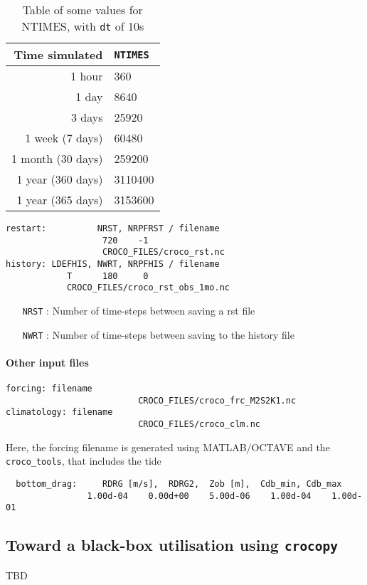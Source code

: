 \documentclass{article}
\begin{document}
\begin{table}[!h]
  \centering
  \begin{tabular}{rl} \hline
   Time simulated & \texttt{NTIMES} \\ \hline
    1 hour & 360 \\
    1 day & 8640 \\
    3 days & 25920 \\
    1 week (7 days)& 60480 \\
    1 month (30 days) & 259200 \\
    1 year (360 days) & 3110400 \\
    1 year (365 days) & 3153600 \\ \hline
  \end{tabular}
  \caption{Table of some values for NTIMES, with \texttt{dt} of 10s}
  \label{tab:NTIMESref}
\end{table}
\begin{lstlisting}
restart:          NRST, NRPFRST / filename
                   720    -1
                   CROCO_FILES/croco_rst.nc
history: LDEFHIS, NWRT, NRPFHIS / filename
            T      180     0
            CROCO_FILES/croco_rst_obs_1mo.nc
\end{lstlisting}
\begin{itemize}
\item[\texttt{NRST}]: Number of time-steps between saving a rst file
\item[\texttt{NWRT}]: Number of time-steps between saving to the history file 
\end{itemize}
\paragraph{Other input files}
\begin{lstlisting}
forcing: filename
                          CROCO_FILES/croco_frc_M2S2K1.nc
climatology: filename
                          CROCO_FILES/croco_clm.nc
\end{lstlisting}
Here, the forcing filename is generated using \textsc{MATLAB/OCTAVE} and the \texttt{croco\_tools}, that includes the tide                        


\begin{lstlisting}
  bottom_drag:     RDRG [m/s],  RDRG2,  Zob [m],  Cdb_min, Cdb_max
                1.00d-04    0.00d+00    5.00d-06    1.00d-04    1.00d-01
\end{lstlisting}

\subsection{Toward a black-box utilisation using \texttt{crocopy}}
TBD
\clearpage
\end{document}
